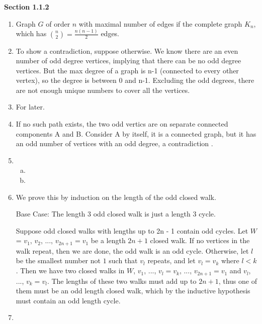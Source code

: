 \documentclass[11pt]{article}
\begin{document}
{\bfseries Section 1.1.2}

\begin{enumerate}[1]
    \item %
        Graph $G$ of order $n$ with maximal number of edges if the complete graph
        $K_n$, which has $\binom{n}{2} = \frac{n(n-1)}{2}$ edges.
    \item %
        To show a contradiction, suppose otherwise. We know there are an even 
        number of odd degree vertices, implying that there can be no odd 
        degree vertices. But the max degree of a graph is n-1 (connected to 
        every other vertex), so the degree is between 0 and n-1. Excluding 
        the odd degrees, there are not enough unique numbers to cover all the
        vertices.
    \item %
        For later.
    \item %
        If no such path exists, the two odd vertics are on separate connected 
        components A and B. Consider A by itself, it is a connected graph, 
        but it has an odd number of vertices with an odd degree, a contradiction
        . 
    \item %
        \begin{enumerate}[a)]
            \item 
                
            \item 
        \end{enumerate}
    \item %
        We prove this by induction on the length of the odd closed walk. 

        Base Case: The length 3 odd closed walk is just a length 3 cycle.

        Suppose odd closed walks with lengths up to 2n - 1 contain odd cycles.
        Let $W$ = $v_1$, $v_2$, ..., $v_{2n+1} = v_1$ be a length $2n+1$ closed walk. 
        If no vertices in the walk repeat, then we are done, the odd walk is an
        odd cycle. Otherwise, let $l$ be the smallest number not $1$ such that $v_l$ 
        repeats, and let $v_l = v_k$ where $l < k$. Then we have two closed walks 
        in $W$, $v_1$, ..., $v_l = v_k$, ..., $v_{2n+1} = v_1$ and $v_l$, ..., 
        $v_k = v_l$. The lengths of these two walks must add up to $2n+1$, thus one
        of them must be an odd length closed walk, which by the inductive hypothesis
        must contain an odd length cycle. 


    \item %


\end{enumerate}
\end{document}
